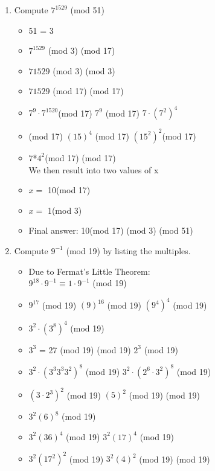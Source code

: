 \documentclass[11pt]{article}
\newcounter{prnum}
\newenvironment{problem}{{\vskip 0.2in\noindent\bf Problem
       \addtocounter{prnum}{1} \arabic{prnum}.}}{\vskip 0.1in}
\begin{document}
\begin{problem}
  \begin{enumerate}
    \item Compute $7^{1529}$ (mod 51)
      \begin{itemize}
        \item 51 = 3
        \item $7^{1529}$ (mod 3) (mod 17)
        \item $7{1529}$ (mod 3) (mod 3)
        \item $7{1529}$ (mod 17) (mod 17)
        \item $7^9 \cdot 7^{1520}$(mod 17) \equiv $7^9$ (mod 17)  \cdot $7\cdot(7^2)^4$
        \item {}(mod 17) $(15)^4$ (mod 17) \cdot$(15^2)^2$(mod 17)
        \item 7*$4^2$(mod 17) (mod 17)\\
          We then result into two values of x
        \item $x =$ 10(mod 17)
        \item $x =$ 1(mod 3)
        \item Final answer: 10(mod 17) (mod 3) (mod 51)
      \end{itemize}
    \item Compute $9^{-1}$ (mod 19) by listing the multiples.
      \begin{itemize}
        \item Due to Fermat's Little Theorem:\\
          $9^{18}\cdot9^{-1} \equiv 1\cdot9^{-1}$ (mod 19)
        \item $9^{17}$ (mod 19)  $(9)^{16}$ (mod 19)  $(9^{4})^{4}$ (mod 19)
        \item $3^{2} \cdot (3^{8})^{4}$ (mod 19)
        \item $3^3$ = 27 (mod 19)  (mod 19) \Rightarrow $2^3$ (mod 19)
        \item $3^2\cdot(3^3 3^3 3^2)^8 $ (mod 19) \equiv $3^2 \cdot (2^6\cdot3^2)^8$ (mod 19)
        \item $(3\cdot 2^3)^2$ (mod 19) \equiv $(5)^2$ (mod 19)  (mod 19)
        \item $3^2 (6)^8$ (mod 19)
        \item $3^2 (36)^4$ (mod 19) \equiv\space $3^2 (17)^4$ (mod 19)
        \item $3^2 (17^2)^2$ (mod 19) \equiv\space $3^2 (4)^2$ (mod 19)  (mod 19)

\end{itemize}
\end{enumerate}
\end{problem}
\end{document}
